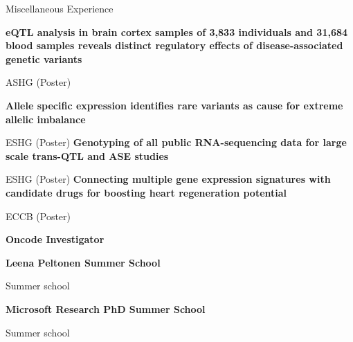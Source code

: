 \begin{rubric}{Miscellaneous Experience}

\entry*[17 October 2019] \textbf{eQTL analysis in brain cortex samples of 3,833 individuals and 31,684 blood samples reveals distinct regulatory effects of disease-associated genetic variants} \par
ASHG (Poster)

\entry*[17 June 2018] \textbf{Allele specific expression identifies rare variants as cause for extreme allelic imbalance} \par
ESHG (Poster)
%
\entry*[25 May 2016] \textbf{Genotyping of all public RNA-sequencing data for large scale trans-QTL and ASE studies} \par
ESHG (Poster)
%
\entry*[8 Sep 2014] \textbf{Connecting multiple gene expression signatures with candidate drugs for boosting heart regeneration potential} \par
ECCB (Poster)

\entry*[Sep 2019 -- ] \textbf{Oncode Investigator} \par


\entry*[Aug 2018] \textbf{Leena Peltonen Summer School} \par
Summer school

\entry*[Jul 2016] \textbf{Microsoft Research PhD Summer School} \par
Summer school

\end{rubric}